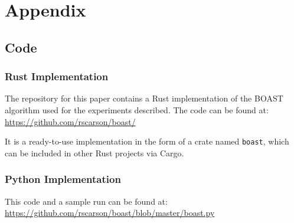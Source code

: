\newpage
\section*{Appendix}

\subsection*{Code}

\subsubsection*{Rust Implementation}

The repository for this paper contains a Rust implementation of the BOAST algorithm used for the experiments described. The code can be found at: \url{https://github.com/rscarson/boast/}

It is a ready-to-use implementation in the form of a crate named \texttt{boast}, which can be included in other Rust projects via Cargo.

\subsubsection*{Python Implementation}

This code and a sample run can be found at: \url{https://github.com/rscarson/boast/blob/master/boast.py}

